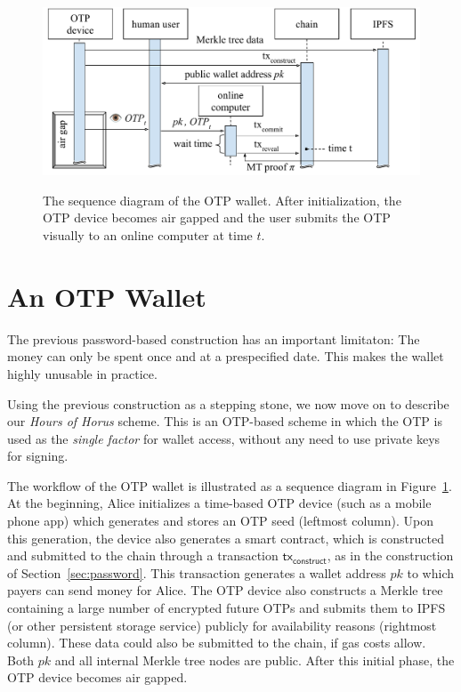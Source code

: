 \begin{figure}[ht]
    \caption{The sequence diagram of the OTP wallet. After initialization, the OTP device
             becomes air gapped and the user submits the OTP visually to an online computer
             at time $t$.}
    \centering
    \includegraphics[width=0.7 \textwidth,keepaspectratio]{figures/otp-sequence-diagram.pdf}
    \label{fig.sequence-diagram}
\end{figure}

\section{An OTP Wallet}

The previous password-based construction has an important limitaton:
The money can only be spent once and at a prespecified date. This makes
the wallet highly unusable in practice.

Using the previous construction as a stepping stone,
we now move on to describe our \emph{Hours of Horus} scheme.
This is an OTP-based scheme in which the OTP is used as the \emph{single factor}
for wallet access, without any need to use private keys for signing.

The workflow of the OTP wallet is illustrated as a sequence diagram
in Figure~\ref{fig.sequence-diagram}. At the beginning, Alice initializes
a time-based OTP device (such as a mobile phone app) which
generates and stores an OTP seed (leftmost column). Upon this generation, the device also
generates a smart contract, which is constructed and submitted to the chain
through a transaction $\textsf{tx}_\textsf{construct}$, as in the construction of
Section~\ref{sec:password}. This transaction generates a wallet address $pk$ to which
payers can send money for Alice. The OTP device also constructs a Merkle tree containing
a large number of encrypted future OTPs and submits them to IPFS~\cite{ipfs} (or other persistent storage service)
publicly for availability reasons (rightmost column). These data could also be submitted to the chain, if
gas costs allow. Both $pk$ and all internal Merkle tree nodes are public. After this
initial phase, the OTP device becomes air gapped.

